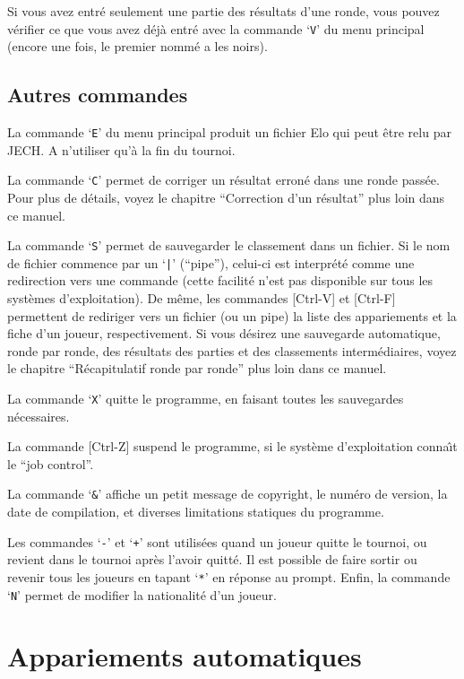 \documentclass[10pt]{article}
\begin{document}
	Si vous avez entr\'e seulement une partie des r\'esultats d'une
ronde, vous pouvez v\'erifier ce que vous avez d\'ej\`a entr\'e avec la
commande `\verb|V|' du menu principal (encore une fois, le premier nomm\'e
a les noirs).

\subsection{Autres commandes}


La commande `\verb|E|' du menu principal produit un fichier Elo qui 
peut \^etre relu par JECH. A n'utiliser qu'\`a la fin du tournoi.

La commande `\verb|C|' permet de corriger un r\'esultat erron\'e dans 
une ronde pass\'ee.  Pour plus de d\'etails, voyez le chapitre 
``Correction d'un r\'esultat'' plus loin dans ce manuel.

La commande `\verb|S|' permet de sauvegarder le classement dans un 
fichier.  Si le nom de fichier commence par un `\verb.|.'  (``pipe''), 
celui-ci est interpr\'et\'e comme une redirection vers une commande 
(cette facilit\'e n'est pas disponible sur tous les syst\`emes 
d'exploitation).  De m\^eme, les commandes [Ctrl-V] et [Ctrl-F] 
permettent de rediriger vers un fichier (ou un pipe) la liste des 
appariements et la fiche d'un joueur, respectivement.  Si vous 
d\'esirez une sauvegarde automatique, ronde par ronde, des r\'esultats 
des parties et des classements interm\'ediaires, voyez le chapitre 
``R\'ecapitulatif ronde par ronde'' plus loin dans ce manuel.

	La commande `\verb|X|' quitte le programme, en faisant toutes les
sauvegardes n\'ecessaires.

	La commande [Ctrl-Z] suspend le programme, si le syst\`eme
d'exploitation conna{\^\i}t le ``job control''.

	La commande `\verb|&|' affiche un petit message de copyright, le
num\'ero de version, la date de compilation, et diverses limitations
statiques du programme.

	Les commandes `\verb|-|' et `\verb|+|' sont utilis\'ees quand un
joueur quitte le tournoi, ou revient dans le tournoi apr\`es l'avoir
quitt\'e.  Il est possible de faire sortir ou revenir tous les joueurs
en tapant `\verb|*|' en r\'eponse au prompt.  Enfin, la commande
`\verb|N|' permet de modifier la nationalit\'e d'un joueur.

\section{Appariements automatiques}
\end{document}
